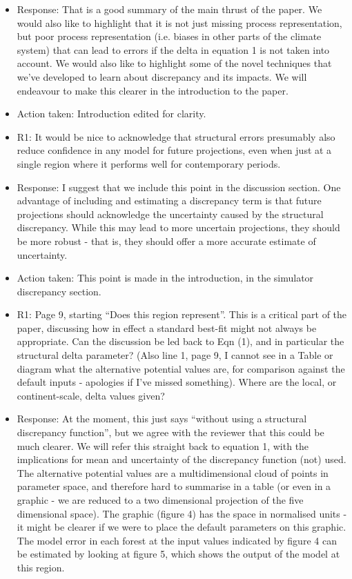 \documentclass[esd, manuscript]{copernicus}
\begin{document}
\begin{itemize}
\item{Response: That is a good summary of the main thrust of the paper. We would also like to highlight that it is not just missing process representation, but poor process representation (i.e. biases in other parts of the climate system) that can lead to errors if the delta in equation 1 is not taken into account. We would also like to highlight some of the novel techniques that we've developed to learn about discrepancy and its impacts. We will endeavour to make this clearer in the introduction to the paper.}

\item{Action taken: Introduction edited for clarity.}

\item{R1: It would be nice to acknowledge that structural errors presumably also reduce confidence in any model for future projections, even when just at a single region where it performs well for contemporary periods.}

\item{Response: I suggest that we include this point in the discussion section. One advantage of including and estimating a discrepancy term is that future projections should acknowledge the uncertainty caused by the structural discrepancy. While this may lead to more uncertain projections, they should be more robust - that is, they should offer a more accurate estimate of uncertainty.}

\item{Action taken: This point is made in the introduction, in the simulator discrepancy section.}

\item{R1: Page 9, starting ``Does this region represent''. This is a critical part of the paper, discussing how in effect a standard best-fit might not always be appropriate. Can the discussion be led back to Eqn (1), and in particular the structural delta parameter? (Also line 1, page 9, I cannot see in a Table or diagram what the alternative potential values are, for comparison against the default inputs - apologies if I've missed something). Where are the local, or continent-scale, delta values given?}

\item{Response: At the moment, this just says ``without using a structural discrepancy function'', but we agree with the reviewer that this could be much clearer. We will refer this straight back to equation 1, with the implications for mean and uncertainty of the discrepancy function (not) used. The alternative potential values are a multidimensional cloud of points in parameter space, and therefore hard to summarise in a table (or even in a graphic - we are reduced to a two dimensional projection of the five dimensional space). The graphic (figure 4) has the space in normalised units - it might be clearer if we were to place the default parameters on this graphic. The model error in each forest at the input values indicated by figure 4 can be estimated by looking at figure 5, which shows the output of the model at this region.}


\end{itemize}
\end{document}
